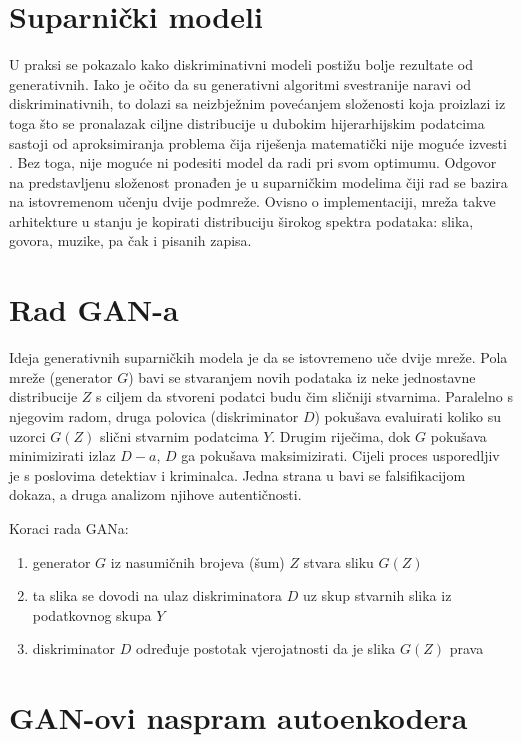 \documentclass[lmodern, utf8, seminar]{fer}
\begin{document}
\section{Suparnički modeli}
U praksi se pokazalo kako diskriminativni modeli postižu bolje rezultate od generativnih. Iako je očito da su generativni algoritmi svestranije naravi od diskriminativnih, to dolazi sa neizbježnim povećanjem složenosti koja proizlazi iz toga što se pronalazak ciljne distribucije u dubokim hijerarhijskim podatcima sastoji od aproksimiranja problema čija riješenja matematički nije moguće izvesti \cite{goodfellow2014generative}. Bez toga, nije moguće ni podesiti model da radi pri svom optimumu. Odgovor na predstavljenu složenost pronađen je u suparničkim modelima čiji rad se bazira na istovremenom učenju dvije podmreže. Ovisno o implementaciji, mreža takve arhitekture u stanju je kopirati distribuciju širokog spektra podataka: slika, govora, muzike, pa čak i pisanih zapisa.
\newline

\section{Rad GAN-a}
Ideja generativnih suparničkih modela je da se istovremeno uče dvije mreže.
Pola mreže (generator $G$) bavi se stvaranjem novih podataka iz neke jednostavne distribucije $Z$ s ciljem da stvoreni podatci budu čim sličniji stvarnima. Paralelno s njegovim radom, druga polovica (diskriminator $D$) pokušava evaluirati koliko su uzorci $G(Z)$ slični stvarnim podatcima $Y$. Drugim riječima, dok $G$ pokušava minimizirati izlaz $D-a$, $D$ ga pokušava maksimizirati.
Cijeli proces usporedljiv je s poslovima detektiav i kriminalca. Jedna strana u bavi se falsifikacijom dokaza, a druga analizom njihove autentičnosti.
\newline

Koraci rada GANa:
\begin{enumerate} 
\item generator $G$ iz nasumičnih brojeva (šum) $Z$ stvara sliku $G(Z)$
\item ta slika se dovodi na ulaz diskriminatora $D$ uz skup stvarnih slika iz podatkovnog skupa $Y$
\item diskriminator $D$ određuje postotak vjerojatnosti da je slika $G(Z)$ prava
\end{enumerate}

\section{GAN-ovi naspram autoenkodera}
\end{document}
